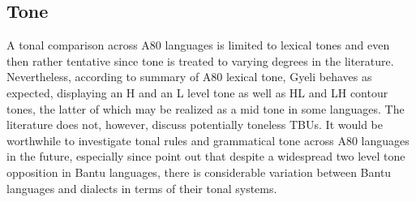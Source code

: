 \subsection{Tone} A tonal comparison across A80 languages is limited to lexical tones and even then rather tentative since tone is treated to varying degrees in the literature. Nevertheless, according to  summary of A80 lexical tone, Gyeli behaves as expected, displaying an H and an L level tone as well as HL and LH contour tones, the latter of which may be realized as a mid tone in some languages. The literature does not, however, discuss potentially toneless TBUs. It would be worthwhile to investigate tonal rules and grammatical tone across A80 languages in the future, especially since \citet[59]{kisseberth2003} point out that despite a widespread two level tone opposition in Bantu languages, there is considerable variation between Bantu languages and dialects in terms of their tonal systems.

















